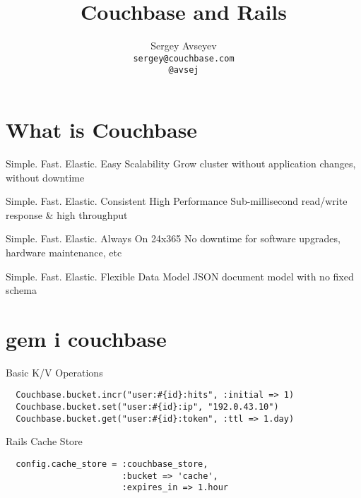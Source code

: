\documentclass[aspectratio=43,handout]{beamer}
\title{Couchbase and Rails}
\author{Sergey Avseyev\\\texttt{sergey@couchbase.com}\\\texttt{@avsej}}
\begin{document}
\titleback
\begin{frame}
  \titlepage
\end{frame}

\section{What is Couchbase}

\begin{frame}{Simple. Fast. Elastic.}
  \claim
    {Easy Scalability}
    {Grow cluster without application changes, without downtime}
\end{frame}

\begin{frame}{Simple. Fast. Elastic.}
  \claim
    {Consistent High Performance}
    {Sub-millisecond read/write response \& high throughput}
\end{frame}

\begin{frame}{Simple. Fast. Elastic.}
  \claim
    {Always On 24x365}
    {No downtime for software upgrades, hardware maintenance, etc}
\end{frame}

\begin{frame}{Simple. Fast. Elastic.}
  \claim
    {Flexible Data Model}
    {JSON document model with no fixed schema}
\end{frame}

\section{gem i couchbase}
\begin{frame}[fragile]{Basic K/V Operations}
  \begin{verbatim}
  Couchbase.bucket.incr("user:#{id}:hits", :initial => 1)
  Couchbase.bucket.set("user:#{id}:ip", "192.0.43.10")
  Couchbase.bucket.get("user:#{id}:token", :ttl => 1.day)
  \end{verbatim}
\end{frame}

\begin{frame}[fragile]{Rails Cache Store}
  \begin{verbatim}
  config.cache_store = :couchbase_store,
                       :bucket => 'cache',
                       :expires_in => 1.hour
  \end{verbatim}
\end{frame}
\end{document}
